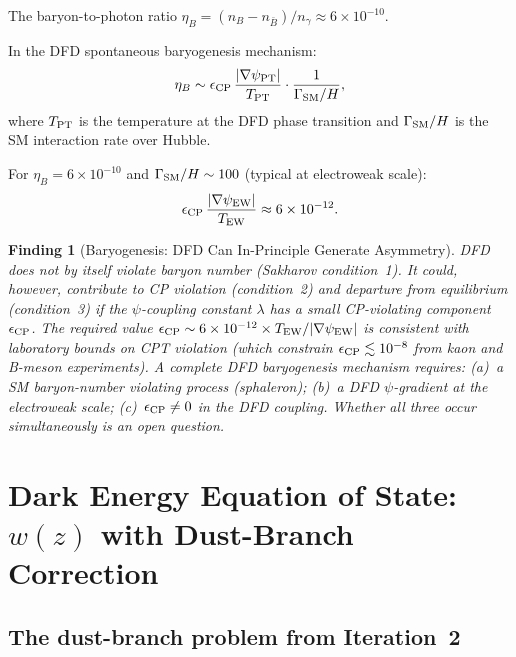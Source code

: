 \documentclass[11pt]{article}
\newtheorem{finding}{Finding}
\newcommand{\ee}[1]{\times 10^{#1}}
\begin{document}
The baryon-to-photon ratio $\eta_B = (n_B - n_{\bar B})/n_\gamma \approx 6\ee{-10}$.

In the DFD spontaneous baryogenesis mechanism:
\begin{equation}
  \eta_B \sim \epsilon_{\rm CP}\,\frac{|\nabla\psi_{\rm PT}|}{T_{\rm PT}}
  \cdot\frac{1}{\Gamma_{\rm SM}/H},
\end{equation}
where $T_{\rm PT}$ is the temperature at the DFD phase transition and
$\Gamma_{\rm SM}/H$ is the SM interaction rate over Hubble.

For $\eta_B = 6\ee{-10}$ and $\Gamma_{\rm SM}/H \sim 100$ (typical at
electroweak scale):
\begin{equation}
  \epsilon_{\rm CP}\,\frac{|\nabla\psi_{\rm EW}|}{T_{\rm EW}}
  \approx 6\ee{-12}.
\end{equation}

\begin{finding}[Baryogenesis: DFD Can In-Principle Generate Asymmetry]
\label{find:baryogenesis}
DFD does not by itself violate baryon number (Sakharov condition~1).
It could, however, contribute to CP violation (condition~2) and
departure from equilibrium (condition~3) if the $\psi$-coupling
constant $\lambda$ has a small CP-violating component $\epsilon_{\rm CP}$.
The required value $\epsilon_{\rm CP}\sim 6\ee{-12}\times T_{\rm EW}/|\nabla\psi_{\rm EW}|$
is consistent with laboratory bounds on CPT violation (which constrain
$\epsilon_{\rm CP} \lesssim 10^{-8}$ from kaon and B-meson experiments).
A complete DFD baryogenesis mechanism requires: (a)~a SM baryon-number
violating process (sphaleron); (b)~a DFD $\psi$-gradient at the
electroweak scale; (c)~$\epsilon_{\rm CP} \neq 0$ in the DFD coupling.
Whether all three occur simultaneously is an open question.
\end{finding}

\section{Dark Energy Equation of State: $w(z)$ with Dust-Branch Correction}
\label{sec:dark-energy-wa}

\subsection{The dust-branch problem from Iteration~2}
\end{document}
